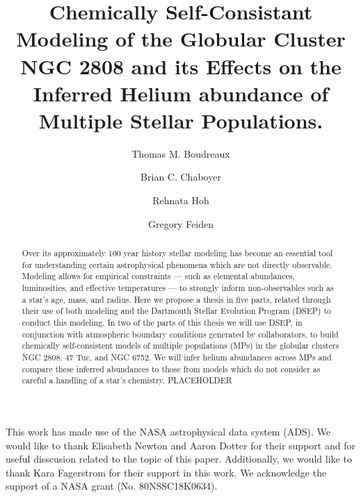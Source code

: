 \documentclass[twocolumn,linenumbers]{src/aastex631}
\begin{document}
\title{Chemically Self-Consistant Modeling of the Globular Cluster NGC 2808 and its Effects on the Inferred Helium abundance of Multiple Stellar Populations.}


\author[0000-0002-2600-7513]{Thomas M. Boudreaux}

\author[0000-0003-3096-4161]{Brian C. Chaboyer}

\author{Rehnata Hoh}

\author[0000-0002-2012-7215]{Gregory Feiden}


\begin{abstract}
	Over its approximately 100 year history stellar modeling has become an
	essential tool for understanding certain astrophysical phenomena which are not
	directly observable. Modeling allows for empirical constraints --- such as
	elemental abundances, luminosities, and effective temperatures --- to strongly
	inform non-observables such as a star's age, mass, and radius. Here we propose a
	thesis in five parts, related through their use of both modeling and the
	Dartmouth Stellar Evolution Program (DSEP) to conduct this modeling. In two of
	the parts of this thesis we will use DSEP, in conjunction with atmospheric
	boundary conditions generated by collaborators, to build chemically
	self-consistent models of multiple populations (MPs) in the globular clusters
	NGC 2808, 47 Tuc, and NGC 6752. We will infer helium abundances across MPs and
	compare these inferred abundances to those from models which do not consider as
	careful a handling of a star's chemistry. PLACEHOLDER
\end{abstract}

\keywords{}








\begin{acknowledgments}
	This work has made use of the NASA astrophysical data system (ADS). We
	would like to thank Elisabeth Newton and Aaron Dotter for their support and
	for useful disscusion related to the topic of this paper. Additionally, we
	would like to thank Kara Fagerstrom for their support in this work. We
	acknowledge the support of a NASA grant (No. 80NSSC18K0634). 
\end{acknowledgments}



{}

\end{document}
